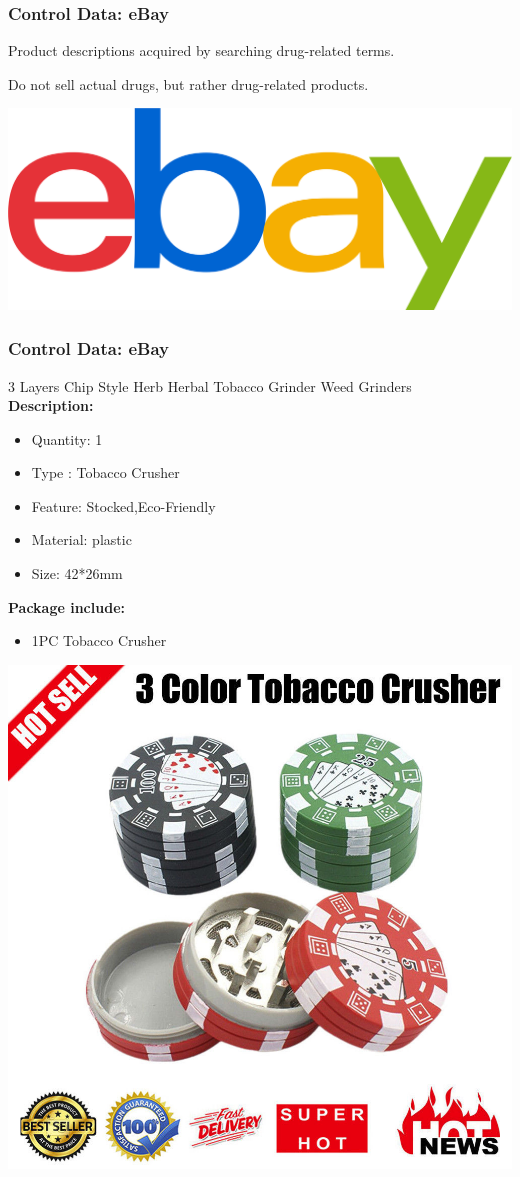\documentclass[t,xcolor={svgnames,table},aspectratio=169]{beamer}
\begin{document}
\begin{frame}[fragile]
	\frametitle{Control Data: eBay}
	\LARGE
	Product descriptions acquired by searching drug-related terms.
	\vfill
	
	Do not sell actual drugs, but rather drug-related products.
	\vfill
	
	\begin{center}
	\includegraphics[width=.5\textwidth]{ebay.png}
	\end{center}
\end{frame}
	
\begin{frame}[fragile]
	\frametitle{Control Data: eBay}
	\Large
	\colorbox{green!30}{\parbox{\textwidth}{\rm
	3 Layers  Chip Style Herb Herbal Tobacco Grinder Weed Grinders\\
	\textbf{Description:}
	\begin{itemize}
	\item[\bullet] Quantity: 1\\
	\item[\bullet] Type : Tobacco Crusher\\
	\item[\bullet] Feature: Stocked,Eco-Friendly\\
	\item[\bullet] Material: plastic\\
	\item[\bullet] Size: 42*26mm
	\end{itemize}
	\textbf{Package include:}
	\begin{itemize}
	\item[\bullet] 1PC  Tobacco Crusher
	\end{itemize}
	}}
	
	\vspace{-36mm}
	\begin{flushright}
	\includegraphics[trim={5cm 6cm 3cm 4cm},clip,width=.3\textwidth]{s-l1600.jpg}
	\end{flushright}
\end{frame}
\end{document}
